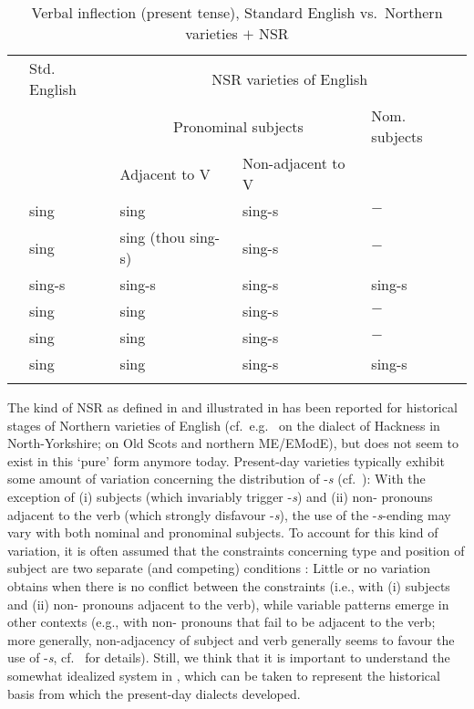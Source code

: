 \documentclass[output=paper]{langsci/langscibook}
\begin{document}
\begin{table}
    \begin{tabular}{lllll}
    \lsptoprule
    &  Std. English &  \multicolumn{3}{c}{\gls{NSR} varieties of English}\\\cmidrule(lr){3-5}
    & & \multicolumn{2}{c}{Pronominal subjects} & Nom. subjects \\
    & & Adjacent to V & Non-adjacent to V\\
    \midrule
    \Fsg{} & sing & sing & sing-s & $-$\\
    \Ssg{} & sing & sing (thou sing-s)  & sing-s & $-$\\
    \Tsg{} & sing-s & sing-s & sing-s & sing-s \\
    \Fpl{} & sing & sing & sing-s & $-$\\
    \Spl{} & sing & sing & sing-s & $-$\\
    \Tpl{} & sing & sing & sing-s & sing-s \\
    \lspbottomrule
  \end{tabular}
  \caption{Verbal inflection (present tense), Standard English
  vs.\ Northern varieties $+$ \gls{NSR}}\label{tab:trips:10.1}
\end{table}

The kind of \gls{NSR} as defined in  and illustrated in
 has been reported for historical stages of Northern varieties
of English (cf.\ e.g.\ \citealt{Cowling:1915} on the dialect of Hackness in
North-Yorkshire; \citealt{Montgomery:1994} on Old Scots and northern ME/EModE), but does
not seem to exist in this `pure' form anymore today. Present-day varieties
typically exhibit some amount of variation concerning the distribution of
-\emph{s} (cf.\ \citealt{Montgomery:1994,Britain:2002,Pietsch:2005a,Pietsch:2005b,AdgerSmith2010,Buchstaller_etal:2013,Childs:2013}): With the exception of (i) \Tsg{} subjects (which
    invariably trigger -\emph{s}) and (ii) non-\Tsg{} pronouns adjacent to the
    verb (which strongly disfavour -\emph{s}), the use of the -\emph{s}-ending
    may vary with both nominal and pronominal subjects. To account for this
    kind of variation, it is often assumed that the constraints concerning type
    and position of subject are two separate (and competing) conditions
    \parencite{Montgomery:1994,Pietsch:2005a,Pietsch:2005b}: Little or no
    variation obtains when there is no conflict between the constraints (i.e.,
    with (i) \Tsg{} subjects and (ii) non-\Tsg{} pronouns adjacent to the
    verb), while variable  patterns emerge in other contexts
    (e.g., with non-\Tsg{} pronouns that fail to be adjacent to the verb; more
    generally, non-adjacency of subject and verb generally seems to favour the
    use of -\emph{s}, cf.\ \citealt{Pietsch:2005b} for details). Still, we think that it
    is important to understand the somewhat idealized system in
    , which can be taken to represent the historical basis
    from which the present-day dialects developed.
\end{document}
